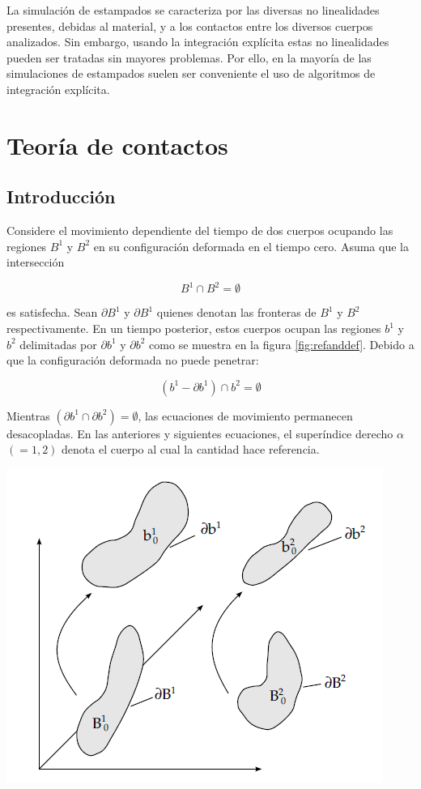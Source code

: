 La simulación de estampados se caracteriza por las diversas no linealidades presentes, debidas al material, y a los contactos entre los diversos cuerpos analizados. Sin embargo, usando la integración explícita estas no linealidades pueden ser tratadas sin mayores problemas. Por ello, en la mayoría de las simulaciones de estampados suelen ser conveniente el uso de algoritmos de integración explícita.

\section{Teoría de contactos}

\subsection{Introducción}

Considere el movimiento dependiente del tiempo de dos cuerpos ocupando las regiones $B^1$ y $B^2$ 
en su configuración deformada en el tiempo cero. Asuma que la intersección

$$
B^1 \cap B^2 = \emptyset
$$

es satisfecha. Sean $\partial B^1$ y $\partial B^1$ quienes denotan las fronteras de $B^1$ y $B^2$ 
respectivamente. En un tiempo posterior, estos cuerpos ocupan las regiones $b^1$ y $b^2$ delimitadas 
por $\partial b^1$ y $\partial b^2$ como se muestra en la figura \ref{fig:refanddef}. Debido a que la 
configuración deformada no puede penetrar:

$$
\left( b^1 - \partial b^1 \right) \cap b^2 = \emptyset
$$

Mientras $\left( \partial b^1 \cap \partial b^2 \right) = \emptyset$, las ecuaciones de movimiento 
permanecen desacopladas. En las anteriores y siguientes ecuaciones, el superíndice derecho $\alpha$ 
$(=1,2)$ denota el cuerpo al cual la cantidad hace referencia.

\begin{center}
\includegraphics[scale=0.6]{src/ch2/ref_and_def.png}
\label{fig:refanddef}
\end{center}

